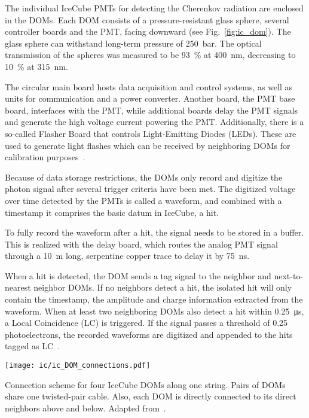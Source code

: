 The individual IceCube PMTs for detecting the Cherenkov radiation are enclosed in the DOMs. Each DOM consists of a pressure-resistant glass sphere, several controller boards and the PMT, facing downward (see Fig.~\ref{fig:ic_dom}). The glass sphere can withstand long-term pressure of \SI{250}{\bar}. The optical transmission of the spheres was measured to be \SI{93}{\percent} at \SI{400}{\nm}, decreasing to \SI{10}{\percent} at \SI{315}{\nm}.

The circular main board hosts data acquisition and control systems, as well as units for communication and a power converter. Another board, the PMT base board, interfaces with the PMT, while additional boards delay the PMT signals and generate the high voltage current powering the PMT. Additionally, there is a so-called Flasher Board that controls Light-Emitting Diodes (LEDs). These are used to generate light flashes which can be received by neighboring DOMs for calibration purposes~.

Because of data storage restrictions, the DOMs only record and digitize the photon signal after several trigger criteria have been met. The digitized voltage over time detected by the PMTs is called a waveform, and combined with a timestamp it comprises the basic datum in IceCube, a hit.

To fully record the waveform after a hit, the signal needs to be stored in a buffer. This is realized with the delay board, which routes the analog PMT signal through a \SI{10}{\m} long, serpentine copper trace to delay it by \SI{75}{\ns}.

When a hit is detected, the DOM sends a tag signal to the neighbor and next-to-nearest neighbor DOMs. If no neighbors detect a hit, the isolated hit will only contain the timestamp, the amplitude and charge information extracted from the waveform. When at least two neighboring DOMs also detect a hit within \SI{0.25}{\micro\s}, a Local Coincidence (LC) is triggered. If the signal passes a threshold of 0.25 photoelectrons, the recorded waveforms are digitized and appended to the hits tagged as LC~\cite{Aartsen2017}.

\begin{marginfigure}
    \texttt{[image: ic/ic\_DOM\_connections.pdf]}
    \caption[IceCube DOM connections]{Connection scheme for four IceCube DOMs along one string. Pairs of DOMs share one twisted-pair cable. Also, each DOM is directly connected to its direct neighbors above and below. Adapted from~\cite{Aartsen2017}.}
\end{marginfigure}

